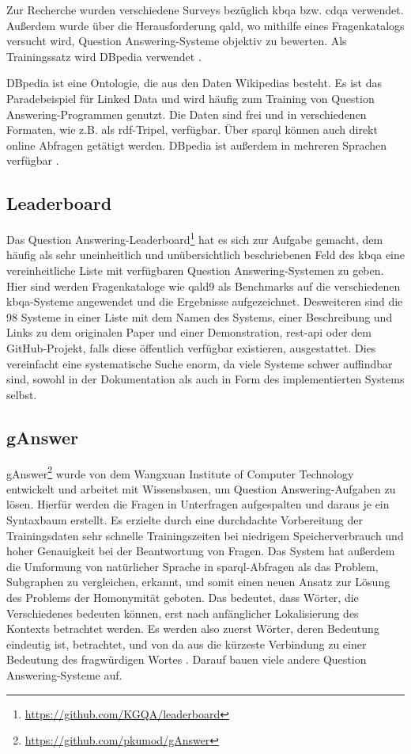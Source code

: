 Zur Recherche wurden verschiedene Surveys bezüglich \ac{kbqa} bzw. \ac{cdqa} verwendet.
Außerdem wurde über die Herausforderung \ac{qald}, wo mithilfe eines Fragenkatalogs versucht wird, Question Answering-Systeme objektiv zu bewerten.
Als Trainingssatz wird DBpedia verwendet \citep{qald9}.

DBpedia ist eine Ontologie, die aus den Daten Wikipedias besteht.
Es ist das Paradebeispiel für Linked Data und wird häufig zum Training von Question Answering-Programmen genutzt.
Die Daten sind frei und in verschiedenen Formaten, wie z.B. als \ac{rdf}-Tripel, verfügbar.
Über \ac{sparql} können auch direkt online Abfragen getätigt werden.
DBpedia ist außerdem in mehreren Sprachen verfügbar \citep{dbpedia}.

\subsection{Leaderboard}

Das Question Answering-Leaderboard\footnote{\url{https://github.com/KGQA/leaderboard}} \citep{kgqaleaderboard} hat es sich zur Aufgabe gemacht,
dem häufig als sehr uneinheitlich und unübersichtlich \citep{diefenbachkbqa} beschriebenen Feld des \ac{kbqa} eine vereinheitliche Liste mit verfügbaren Question Answering-Systemen zu geben.
Hier sind werden Fragenkataloge wie \ac{qald9} als Benchmarks auf die verschiedenen \ac{kbqa}-Systeme angewendet und die Ergebnisse aufgezeichnet.
Desweiteren sind die 98 Systeme in einer Liste mit dem Namen des Systems, einer Beschreibung und Links zu dem originalen Paper und einer Demonstration,
\ac{rest}-\ac{api} oder dem GitHub-Projekt, falls diese öffentlich verfügbar existieren, ausgestattet.
Dies vereinfacht eine systematische Suche enorm, da viele Systeme schwer auffindbar sind, sowohl in der Dokumentation als auch in Form des implementierten Systems selbst.

\subsection{gAnswer}

gAnswer\footnote{\url{https://github.com/pkumod/gAnswer}} \citep{ganswer2} wurde von dem Wangxuan Institute of Computer Technology entwickelt und arbeitet mit Wissensbasen, um Question Answering-Aufgaben zu lösen.
Hierfür werden die Fragen in Unterfragen aufgespalten und daraus je ein Syntaxbaum erstellt.
Es erzielte durch eine durchdachte Vorbereitung der Trainingsdaten sehr schnelle Trainingszeiten bei niedrigem Speicherverbrauch und hoher Genauigkeit bei der Beantwortung von Fragen.
Das System hat außerdem die Umformung von natürlicher Sprache in \ac{sparql}-Abfragen als das Problem,
Subgraphen zu vergleichen, erkannt, und somit einen neuen Ansatz zur Lösung des Problems der Homonymität geboten.
Das bedeutet, dass Wörter, die Verschiedenes bedeuten können, erst nach anfänglicher Lokalisierung des Kontexts betrachtet werden.
Es werden also zuerst Wörter, deren Bedeutung eindeutig ist, betrachtet, und von da aus die kürzeste Verbindung zu einer Bedeutung des fragwürdigen Wortes \citep{ganswerapproach}.
Darauf bauen viele andere Question Answering-Systeme auf.

